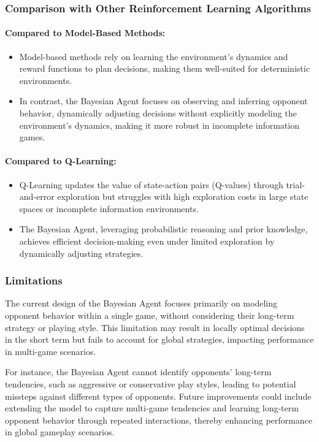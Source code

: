 \documentclass{article}
\begin{document}
\subsubsection*{Comparison with Other Reinforcement Learning Algorithms}

\paragraph{Compared to Model-Based Methods:}
\begin{itemize}
    \item Model-based methods rely on learning the environment's dynamics and reward functions to plan decisions, making them well-suited for deterministic environments.
    \item In contrast, the Bayesian Agent focuses on observing and inferring opponent behavior, dynamically adjusting decisions without explicitly modeling the environment's dynamics, making it more robust in incomplete information games.
\end{itemize}

\paragraph{Compared to Q-Learning:}
\begin{itemize}
    \item Q-Learning updates the value of state-action pairs (Q-values) through trial-and-error exploration but struggles with high exploration costs in large state spaces or incomplete information environments.
    \item The Bayesian Agent, leveraging probabilistic reasoning and prior knowledge, achieves efficient decision-making even under limited exploration by dynamically adjusting strategies.
\end{itemize}

\subsubsection*{Limitations}
The current design of the Bayesian Agent focuses primarily on modeling opponent behavior within a single game, without considering their long-term strategy or playing style. This limitation may result in locally optimal decisions in the short term but fails to account for global strategies, impacting performance in multi-game scenarios.

For instance, the Bayesian Agent cannot identify opponents' long-term tendencies, such as aggressive or conservative play styles, leading to potential missteps against different types of opponents. Future improvements could include extending the model to capture multi-game tendencies and learning long-term opponent behavior through repeated interactions, thereby enhancing performance in global gameplay scenarios.
\end{document}
